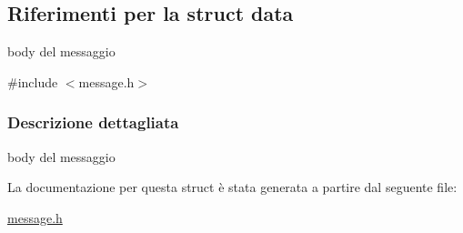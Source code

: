 \hypertarget{structdata}{}\subsection{Riferimenti per la struct data}
\label{structdata}


body del messaggio  




{\ttfamily \#include $<$message.\+h$>$}



\subsubsection{Descrizione dettagliata}
body del messaggio 

La documentazione per questa struct è stata generata a partire dal seguente file\+:\begin{DoxyCompactItemize}
\item 
\mbox{\hyperlink{message_8h}{message.\+h}}\end{DoxyCompactItemize}
